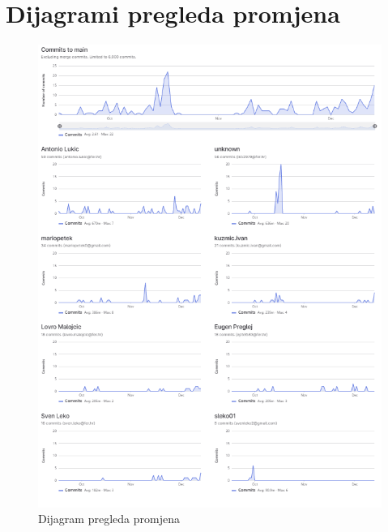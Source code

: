 					
		\eject
		\section*{Dijagrami pregleda promjena}
		
		\begin{figure}[H]
		\centering
		\includegraphics[width=14cm]{slike/dijagramPromjena}
		\caption{Dijagram pregleda promjena}
		\label{fig:Dijagram-promjena}
	\end{figure}
		
	
